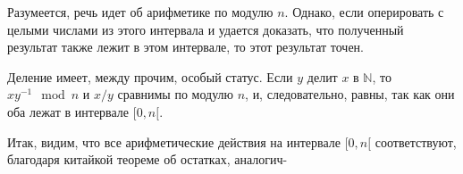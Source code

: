     Разумеется, речь идет об арифметике по модулю $n$. Однако, если оперировать с целыми числами из этого интервала и удается доказать, что полученный результат также лежит в этом интервале, то этот результат точен.

    Деление имеет, между прочим, особый статус. Если $y$ делит $x$ в $\mathbb{N}$, то $xy^{-1} \mod n$ и $x/y$ сравнимы по модулю $n$, и, следовательно, равны, так как они оба лежат в интервале $[0, n [$.

    Итак, видим, что все арифметические действия на интервале $[0, n [$ \linebreak соответствуют, благодаря китайкой теореме об остатках, аналогич-\linebreak

\newpage
